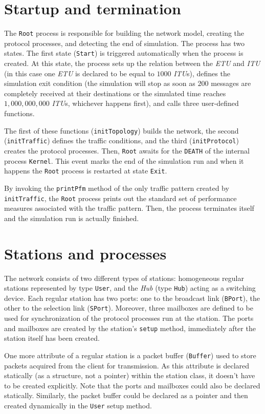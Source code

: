 \section{Startup and termination}

The {\tt Root} process is responsible for building the network model,
creating the protocol processes, and detecting the end of simulation.
The process has two states.
The first state ({\tt Start}) is triggered automatically when the process is
created.
At this state, the process sets up the relation between the {\em ETU\/} and
{\em ITU} (in this case one {\em ETU\/} is declared to be equal to $1000$
{\em ITU\/}s), defines the simulation exit condition (the simulation will stop
as soon as $200$ messages are completely received at their destinations or
the simulated time reaches $1,000,000,000$ {\em ITU}s, whichever happens first),
and calls three user-defined functions.

The first of these functions ({\tt initTopology})
builds the network, the second ({\tt initTraffic}) defines
the traffic conditions, and the third ({\tt initProtocol})
creates the protocol processes.
Then, {\tt Root} awaits for the {\tt DEATH} of the internal process
{\tt Kernel}.
This event marks the end of the simulation run and when it happens
the {\tt Root} process is restarted at state {\tt Exit}.

By invoking the {\tt printPfm} method of the only traffic
pattern created by {\tt initTraffic}, the {\tt Root} process prints out
the standard set of performance measures associated with the traffic pattern.
Then, the process terminates itself and the simulation run is actually
finished.

\section{Stations and processes}

The network consists of two different types of stations: homogeneous
regular stations represented by type {\tt User},
and the {\em Hub} (type {\tt Hub}) acting as a switching device.
Each regular station has two ports: one to the broadcast link ({\tt BPort}),
the other to the selection link ({\tt SPort}).
Moreover, three mailboxes are defined to be used for synchronization
of the protocol processes run at the station.
The ports and mailboxes are created by the station's {\tt setup} method,
immediately after the station itself has been created.

One more attribute of a regular station is a packet buffer ({\tt Buffer})
used to store packets acquired from the client for transmission.
As this attribute is declared statically (as a structure, not a pointer)
within the
station class, it doesn't have to be created explicitly.
Note that the ports and mailboxes could also be declared statically.
Similarly, the packet buffer could be declared as a pointer and then created
dynamically in the {\tt User} setup method.

